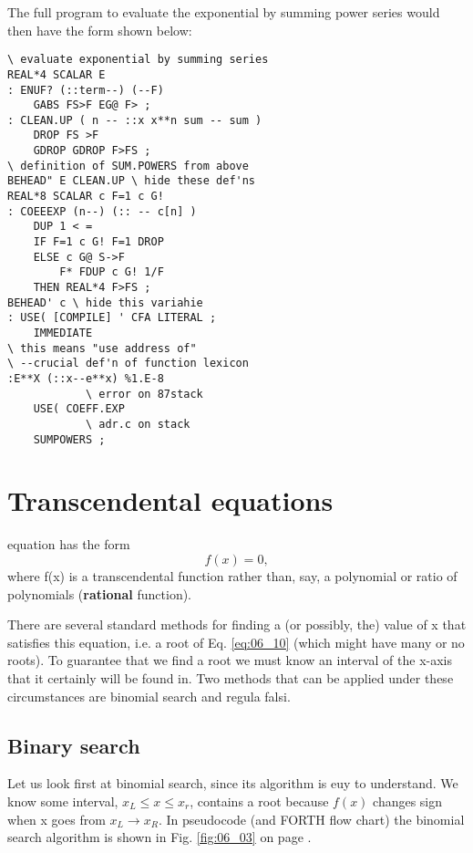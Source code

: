 The full program to evaluate the exponential by summing power series would then have the form shown below:

\begin{multicols}{2}
\begin{lstlisting}[basicstyle=\scriptsize,]
\ evaluate exponential by summing series
REAL*4 SCALAR E
: ENUF? (::term--) (--F)
    GABS FS>F EG@ F> ;
: CLEAN.UP ( n -- ::x x**n sum -- sum )
    DROP FS >F
    GDROP GDROP F>FS ;
\ definition of SUM.POWERS from above
BEHEAD" E CLEAN.UP \ hide these def'ns
REAL*8 SCALAR c F=1 c G!
: COEEEXP (n--) (:: -- c[n] )
    DUP 1 < =
    IF F=1 c G! F=1 DROP
    ELSE c G@ S->F
        F* FDUP c G! 1/F
    THEN REAL*4 F>FS ;
BEHEAD' c \ hide this variahie
: USE( [COMPILE] ' CFA LITERAL ;
    IMMEDIATE
\ this means "use address of"
\ --crucial def'n of function lexicon
:E**X (::x--e**x) %1.E-8
            \ error on 87stack
    USE( COEFF.EXP
            \ adr.c on stack
    SUMPOWERS ;
\end{lstlisting}
\end{multicols}

\section{Transcendental equations}

 equation has the form
\begin{equation}
f(x) = 0,
    \label{eq:06_10}
\end{equation}
where f(x) is a transcendental function rather than, say, a polynomial or ratio of polynomials (\textbf{rational} function).

There are several standard methods for finding a (or possibly, the) value of x that satisfies this equation, i.e. a root of Eq. \ref{eq:06_10} (which might have many or no roots). To guarantee that we find a root we must know an interval of the x-axis that it certainly will be found in. Two methods that can be applied under these circumstances are binomial search and regula falsi.

\subsection{Binary search}

Let us look first at binomial search, since its algorithm is euy to understand. We know some interval, $x_L \leq x \leq x_r$, contains a root because $f(x)$ changes sign when x goes from $x_L \rightarrow x_R$. In pseudocode (and FORTH flow chart) the binomial search algorithm is shown in Fig. \ref{fig:06_03} on page \pageref{fig:06_03}.

